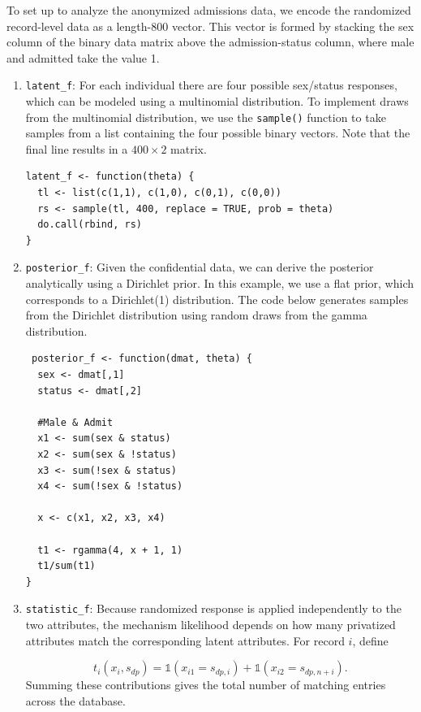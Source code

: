 To set up  to analyze the anonymized admissions data, we encode
the randomized record-level data as a length-800 vector. This vector is formed
by stacking the sex column of the binary data matrix above the admission-status
column, where male and admitted take the value 1.

\begin{enumerate}
\def\labelenumi{\arabic{enumi}.}
\item
  \texttt{latent\_f}: For each individual there are four possible
  sex/status responses, which can be modeled using a multinomial distribution.
  To implement draws from the multinomial distribution, we use the \texttt{sample()} function
  to take samples from a list containing the four possible binary vectors. Note that
  the final line results in a \(400 \times 2\) matrix.

\begin{verbatim}
latent_f <- function(theta) {
  tl <- list(c(1,1), c(1,0), c(0,1), c(0,0))
  rs <- sample(tl, 400, replace = TRUE, prob = theta)
  do.call(rbind, rs)
}
\end{verbatim}
\item
  \texttt{posterior\_f}: Given the confidential data, we can derive the posterior analytically
  using a Dirichlet prior. In this example, we use a flat prior, which
  corresponds to a Dirichlet(1) distribution. The code below generates samples from the Dirichlet distribution
  using random draws from the gamma distribution.

\begin{verbatim}
 posterior_f <- function(dmat, theta) {
  sex <- dmat[,1]
  status <- dmat[,2]

  #Male & Admit
  x1 <- sum(sex & status)
  x2 <- sum(sex & !status)
  x3 <- sum(!sex & status)
  x4 <- sum(!sex & !status)

  x <- c(x1, x2, x3, x4)

  t1 <- rgamma(4, x + 1, 1)
  t1/sum(t1)
}
\end{verbatim}
\item
  \texttt{statistic\_f}: Because randomized response is applied independently to the
  two attributes, the mechanism likelihood depends on how many privatized
  attributes match the corresponding latent attributes. For record \(i\), define

  \begin{equation*}
   t_i(x_i, s_{dp}) =
   \mathbb{1}(x_{i1} = s_{dp,i}) +
   \mathbb{1}(x_{i2} = s_{dp,n+i}).
   \end{equation*}
  Summing these contributions gives the total number of matching entries across
  the database.


\end{enumerate}
